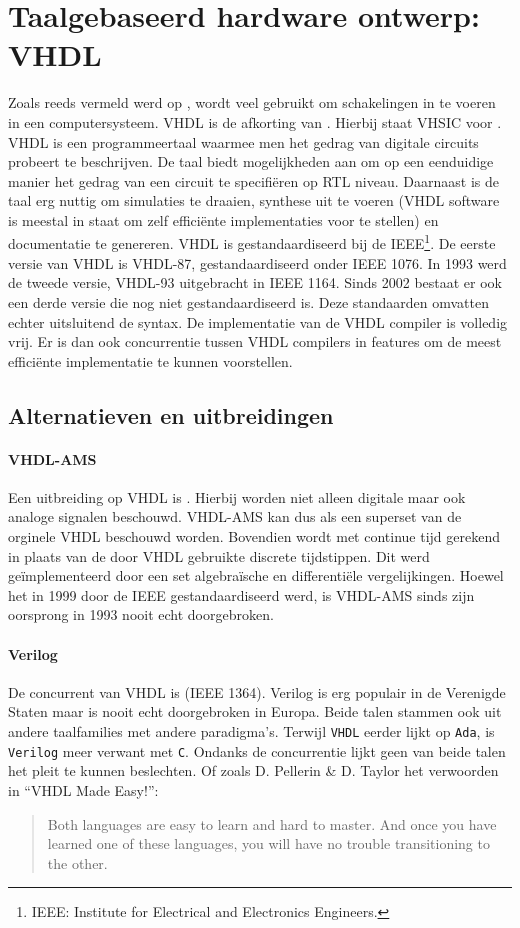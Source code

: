 \section{Taalgebaseerd hardware ontwerp: VHDL}
\label{s:vhdl}
Zoals reeds vermeld werd op , wordt  veel gebruikt om schakelingen in te voeren in een computersysteem. VHDL is de afkorting van . Hierbij staat VHSIC voor . VHDL is een programmeertaal waarmee men het gedrag van digitale circuits probeert te beschrijven. De taal biedt mogelijkheden aan om op een eenduidige manier het gedrag van een circuit te specifi\"eren op RTL niveau. Daarnaast is de taal erg nuttig om simulaties te draaien, synthese uit te voeren (VHDL software is meestal in staat om zelf effici\"ente implementaties voor te stellen) en documentatie te genereren. VHDL is gestandaardiseerd bij de IEEE\footnote{IEEE: Institute for Electrical and Electronics Engineers.}. De eerste versie van VHDL is VHDL-87, gestandaardiseerd onder IEEE 1076. In 1993 werd de tweede versie, VHDL-93 uitgebracht in IEEE 1164. Sinds 2002 bestaat er ook een derde versie die nog niet gestandaardiseerd is. Deze standaarden omvatten echter uitsluitend de syntax. De implementatie van de VHDL compiler is volledig vrij. Er is dan ook concurrentie tussen VHDL compilers in features om de meest effici\"ente implementatie te kunnen voorstellen.
\subsection{Alternatieven en uitbreidingen}
\paragraph{VHDL-AMS}Een uitbreiding op VHDL is . Hierbij worden niet alleen digitale maar ook analoge signalen beschouwd. VHDL-AMS kan dus als een superset van de orginele VHDL beschouwd worden. Bovendien wordt met continue tijd gerekend in plaats van de door VHDL gebruikte discrete tijdstippen. Dit werd ge\"implementeerd door een set algebra\"ische en differenti\"ele vergelijkingen. Hoewel het in 1999 door de IEEE gestandaardiseerd werd, is VHDL-AMS sinds zijn oorsprong in 1993 nooit echt doorgebroken.
\paragraph{Verilog}De concurrent van VHDL is  (IEEE 1364). Verilog is erg populair in de Verenigde Staten maar is nooit echt doorgebroken in Europa. Beide talen stammen ook uit andere taalfamilies met andere paradigma's. Terwijl \verb+VHDL+ eerder lijkt op \verb+Ada+, is \verb+Verilog+ meer verwant met \verb+C+. Ondanks de concurrentie lijkt geen van beide talen het pleit te kunnen beslechten. Of zoals D. Pellerin \& D. Taylor het verwoorden in ``VHDL Made Easy!''\cite{pellerin1997vhdl}:
\begin{quote}
Both languages are easy to learn and hard to master. And once you have learned one of these languages, you will have no trouble transitioning to the other.
\end{quote}

